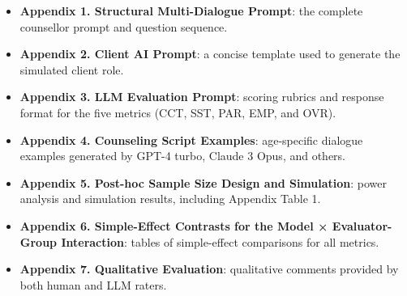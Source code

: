 \documentclass{wiley-article}
\begin{document}
\begin{itemize}
  \item \textbf{Appendix 1. Structural Multi-Dialogue Prompt}: the complete counsellor prompt and question sequence.
  \item \textbf{Appendix 2. Client AI Prompt}: a concise template used to generate the simulated client role.
  \item \textbf{Appendix 3. LLM Evaluation Prompt}: scoring rubrics and response format for the five metrics (CCT, SST, PAR, EMP, and OVR).
  \item \textbf{Appendix 4. Counseling Script Examples}: age-specific dialogue examples generated by GPT-4 turbo, Claude 3 Opus, and others.
  \item \textbf{Appendix 5. Post-hoc Sample Size Design and Simulation}: power analysis and simulation results, including Appendix Table 1.
  \item \textbf{Appendix 6. Simple-Effect Contrasts for the Model × Evaluator-Group Interaction}: tables of simple-effect comparisons for all metrics.
  \item \textbf{Appendix 7. Qualitative Evaluation}: qualitative comments provided by both human and LLM raters.
\end{itemize}




% 
% 



\clearpage                
% 
\end{document}
